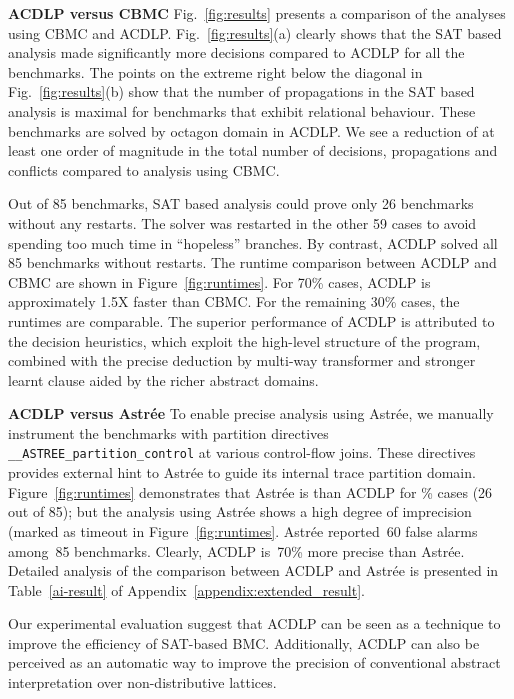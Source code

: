 


%
\textbf{ACDLP versus CBMC}
Fig.~\ref{fig:results} presents a comparison of the analyses using CBMC
and ACDLP.  Fig.~\ref{fig:results}(a) clearly shows that the SAT based analysis 
made significantly more decisions compared to ACDLP for all the benchmarks. 
The points on the extreme right below the diagonal in
Fig.~\ref{fig:results}(b) show that the number of propagations in the SAT based 
analysis is maximal for benchmarks that exhibit relational behaviour.  These
benchmarks are solved by octagon domain in ACDLP.  We see a reduction of at 
least one order of magnitude in the total number of decisions, propagations and conflicts compared 
to analysis using CBMC.  

Out of 85 benchmarks, SAT based analysis could prove only 26
benchmarks without any restarts.  The solver was restarted in the other 59 
cases to avoid spending too much time in ``hopeless'' branches.  By contrast, 
ACDLP solved all 85 benchmarks without restarts.  
The runtime comparison between ACDLP and CBMC are shown in 
Figure~\ref{fig:runtimes}.  For 70\% cases, ACDLP is approximately 1.5X 
faster than CBMC. For the remaining 30\% cases, the runtimes are comparable. 
The superior performance of ACDLP is attributed to the decision heuristics, 
which exploit the high-level structure of the program, combined with the 
precise deduction by multi-way transformer and stronger learnt clause aided 
by the richer abstract domains.  
%


\noindent \textbf{ACDLP versus Astr{\'e}e}
%
To enable precise analysis using Astr{\'e}e, we manually instrument 
the benchmarks with partition directives \texttt{\_\_ASTREE\_partition\_control} 
at various control-flow joins.  These directives provides external hint to
Astr{\'e}e to guide its internal trace partition domain. 
Figure~\ref{fig:runtimes} demonstrates that Astr{\'e}e is  
than ACDLP for \% cases (26 out of 85); but the analysis using 
Astr{\'e}e shows a high degree of imprecision (marked as timeout in 
Figure~\ref{fig:runtimes}.  Astr{\'e}e reported~60 false alarms among~85 benchmarks.  
Clearly, ACDLP is~70\% more precise than Astr{\'e}e. Detailed analysis of the comparison
between ACDLP and Astr{\'e}e is presented in Table~\ref{ai-result} of 
Appendix~\ref{appendix:extended_result}. 


Our experimental evaluation suggest that ACDLP can be seen as a
technique to improve the efficiency of SAT-based BMC.  Additionally, ACDLP can
also be perceived as an automatic way to improve the precision of conventional
abstract interpretation over non-distributive lattices. 
